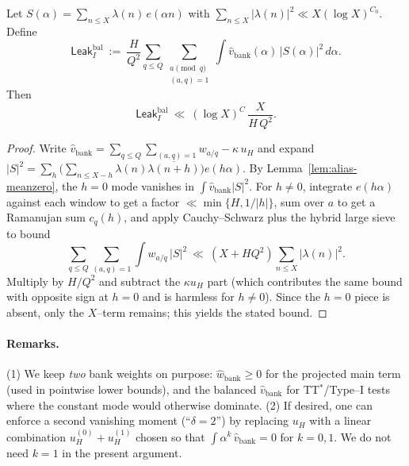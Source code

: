 \begin{proposition}\label{prop:hls-alias}
Let $S(\alpha)=\sum_{n\le X}\lambda(n)\,e(\alpha n)$ with $\sum_{n\le X}|\lambda(n)|^2\ll X(\log X)^{C_0}$.
Define
\[
\mathsf{Leak}_I^{\mathrm{bal}}\ :=\ \frac{H}{Q^2}
\sum_{q\le Q}\sum_{\substack{a\pmod q\\(a,q)=1}}
\int \widehat v_{\mathrm{bank}}(\alpha)\,|S(\alpha)|^2\,d\alpha.
\]
Then
\[
\mathsf{Leak}_I^{\mathrm{bal}}\ \ll\ (\log X)^{C}\,\frac{X}{H\,Q^2}.
\]
\end{proposition}
\begin{proof}
Write $\widehat v_{\mathrm{bank}}=\sum_{q\le Q}\sum_{(a,q)=1}w_{a/q}-\kappa\,u_H$ and expand $|S|^2=\sum_{h}\Big(\sum_{n\le X-h}\lambda(n)\overline{\lambda(n+h)}\Big)e(h\alpha)$.
By Lemma~\ref{lem:alias-meanzero}, the $h=0$ mode vanishes in $\int \widehat v_{\mathrm{bank}}|S|^2$.
For $h\ne 0$, integrate $e(h\alpha)$ against each window to get a factor $\ll \min\{H,1/|h|\}$,
sum over $a$ to get a Ramanujan sum $c_q(h)$, and apply Cauchy–Schwarz plus the hybrid large sieve to bound
\[
\sum_{q\le Q}\sum_{(a,q)=1}\int w_{a/q}\,|S|^2
\ \ll\ (X+H Q^2)\sum_{n\le X}|\lambda(n)|^2.
\]
Multiply by $H/Q^2$ and subtract the $\kappa u_H$ part (which contributes the same bound with opposite sign at $h=0$ and is harmless for $h\ne 0$).
Since the $h=0$ piece is absent, only the $X$–term remains; this yields the stated bound.
\end{proof}

\paragraph{Remarks.}
(1) We keep \emph{two} bank weights on purpose: $\widehat w_{\mathrm{bank}}\ge 0$ for the projected main term (used in pointwise lower bounds), and the balanced $\widehat v_{\mathrm{bank}}$ for TT$^\ast$/Type–I tests where the constant mode would otherwise dominate.  
(2) If desired, one can enforce a second vanishing moment (``$\delta=2$'') by replacing $u_H$ with a linear combination $u_H^{(0)}+u_H^{(1)}$ chosen so that $\int \alpha^k\,\widehat v_{\mathrm{bank}}=0$ for $k=0,1$. We do not need $k=1$ in the present argument.


